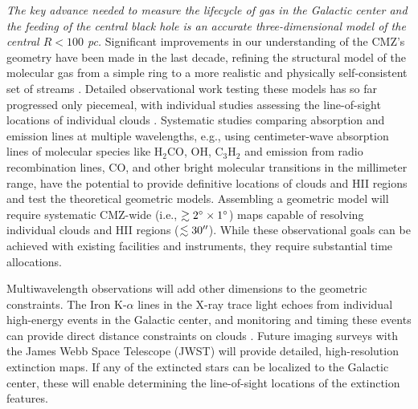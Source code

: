 \documentclass[modern]{aastex62}
\begin{document}
\textit{The key advance needed to measure the lifecycle of gas in the Galactic center and the feeding of the central black hole is an accurate three-dimensional
model of the central $R<100$ pc.} Significant improvements in our understanding
of the CMZ's geometry have been made in the last decade, refining the structural
model of the molecular gas from a simple ring to a more realistic and physically
self-consistent set of streams
\citep{Molinari2011a,Kruijssen2015a,Ridley2017a,Sormani2018a,Kruijssen2019b}.  Detailed observational work testing these models has so far progressed only piecemeal, with individual studies assessing the line-of-sight locations of individual clouds \citep[e.g.][]{Butterfield2018a}. Systematic studies comparing absorption and emission lines at multiple wavelengths, e.g., using centimeter-wave absorption lines of molecular species like H$_2$CO, OH, C$_3$H$_2$ and emission from radio recombination lines, CO, and other bright molecular transitions in the millimeter range, have the potential to provide definitive locations of clouds and HII regions and test the theoretical geometric models.  Assembling a geometric model will require systematic CMZ-wide (i.e., $\gtrsim2^{\circ}\times1^{\circ}$) maps capable of resolving individual clouds and HII regions ($\lesssim30\mbox{$^{\prime\prime}$}$).  While these observational goals can be achieved with existing facilities and instruments, they require substantial time allocations.

Multiwavelength observations will add other dimensions to the geometric constraints.
The Iron K-$\alpha$ lines in the X-ray trace light echoes from individual high-energy events in the Galactic center, and monitoring and timing these events can provide direct distance constraints on clouds \citep[e.g.][]{Clavel2014a,Churazov2017b,Churazov2017a,Terrier2018a}. Future imaging surveys with the James Webb Space Telescope (JWST) will provide detailed, high-resolution extinction maps. If any of the extincted stars can be localized to the Galactic center, these will enable determining the line-of-sight locations of the extinction features.
\end{document}
